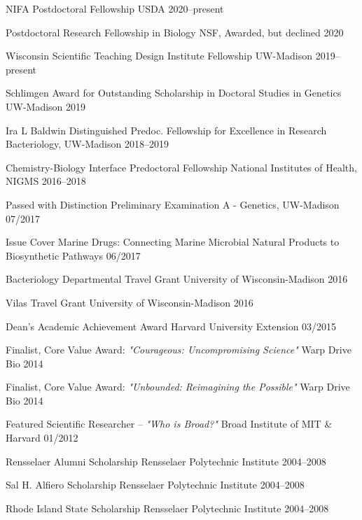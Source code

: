 \begin{cvhonors}

\cvhonor
{NIFA Postdoctoral Fellowship}
{USDA}
{2020--present}

\cvhonor
{Postdoctoral Research Fellowship in Biology}
{NSF, Awarded, but declined}
{2020}

\cvhonor
{Wisconsin Scientific Teaching Design Institute Fellowship}
{UW-Madison}
{2019--present}

\cvhonor
{Schlimgen Award for Outstanding Scholarship in Doctoral Studies in Genetics}
{UW-Madison}
{2019}

\cvhonor
{Ira L Baldwin Distinguished Predoc. Fellowship for Excellence in Research}
{Bacteriology, UW-Madison}
{2018--2019}

\cvhonor
{Chemistry-Biology Interface Predoctoral Fellowship}
{National Institutes of Health, NIGMS}
{2016--2018}

\cvhonor
{Passed with Distinction}
{Preliminary Examination A - Genetics, UW-Madison}
{07/2017}

\cvhonor
{Issue Cover}
{Marine Drugs: Connecting Marine Microbial Natural Products to Biosynthetic Pathways}
{06/2017}

\cvhonor
{Bacteriology Departmental Travel Grant}
{University of Wisconsin-Madison}
{2016}

\cvhonor
{Vilas Travel Grant}
{University of Wisconsin-Madison}
{2016}

\cvhonor
{Dean's Academic Achievement Award}
{Harvard University Extension}
{03/2015}

\end{cvhonors} \begin{cvhonors}

\cvhonor
{Finalist, Core Value Award: \textit{"Courageous: Uncompromising Science"}}
{Warp Drive Bio}
{2014}

\cvhonor
{Finalist, Core Value Award: \textit{"Unbounded: Reimagining the Possible"}}
{Warp Drive Bio}
{2014}

\cvhonor
{Featured Scientific Researcher -- \textit{"Who is Broad?"}}
{Broad Institute of MIT \& Harvard}
{01/2012}

\cvhonor
{Rensselaer Alumni Scholarship}
{Rensselaer Polytechnic Institute}
{2004--2008}

\cvhonor
{Sal H. Alfiero Scholarship}
{Rensselaer Polytechnic Institute}
{2004--2008}

\cvhonor
{Rhode Island State Scholarship}
{Rensselaer Polytechnic Institute}
{2004--2008}

\end{cvhonors}
